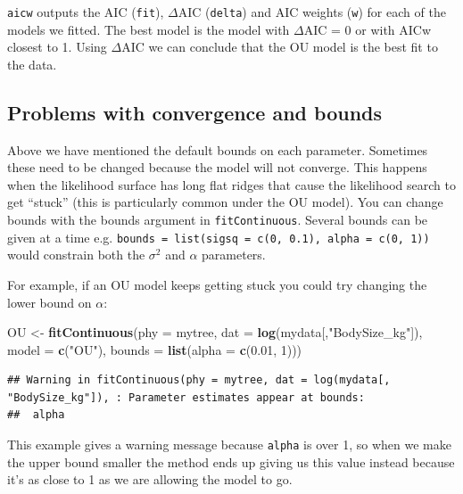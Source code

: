 \documentclass[]{book}
\newenvironment{Shaded}{\begin{snugshade}}{\end{snugshade}}
\newcommand{\KeywordTok}[1]{\textcolor[rgb]{0.13,0.29,0.53}{\textbf{{#1}}}}
\newcommand{\DataTypeTok}[1]{\textcolor[rgb]{0.13,0.29,0.53}{{#1}}}
\newcommand{\DecValTok}[1]{\textcolor[rgb]{0.00,0.00,0.81}{{#1}}}
\newcommand{\FloatTok}[1]{\textcolor[rgb]{0.00,0.00,0.81}{{#1}}}
\newcommand{\StringTok}[1]{\textcolor[rgb]{0.31,0.60,0.02}{{#1}}}
\newcommand{\NormalTok}[1]{{#1}}
\theoremstyle{definition}
\theoremstyle{definition}
\theoremstyle{definition}
\theoremstyle{remark}
\begin{document}
\texttt{aicw} outputs the AIC (\texttt{fit}), \(\Delta\)AIC
(\texttt{delta}) and AIC weights (\texttt{w}) for each of the models we
fitted. The best model is the model with \(\Delta\)AIC = 0 or with AICw
closest to 1. Using \(\Delta\)AIC we can conclude that the OU model is
the best fit to the data.

\subsection{Problems with convergence and
bounds}\label{problems-with-convergence-and-bounds}

Above we have mentioned the default bounds on each parameter. Sometimes
these need to be changed because the model will not converge. This
happens when the likelihood surface has long flat ridges that cause the
likelihood search to get ``stuck'' (this is particularly common under
the OU model). You can change bounds with the bounds argument in
\texttt{fitContinuous}. Several bounds can be given at a time e.g.
\texttt{bounds\ =\ list(sigsq\ =\ c(0,\ 0.1),\ alpha\ =\ c(0,\ 1))}
would constrain both the \(\sigma^2\) and \(\alpha\) parameters.

For example, if an OU model keeps getting stuck you could try changing
the lower bound on \(\alpha\):

\begin{Shaded}
\begin{Highlighting}[]
\NormalTok{OU <-}\StringTok{ }\KeywordTok{fitContinuous}\NormalTok{(}\DataTypeTok{phy =} \NormalTok{mytree, }\DataTypeTok{dat =} \KeywordTok{log}\NormalTok{(mydata[,}\StringTok{"BodySize_kg"}\NormalTok{]), }\DataTypeTok{model =} \KeywordTok{c}\NormalTok{(}\StringTok{"OU"}\NormalTok{), }
                    \DataTypeTok{bounds =} \KeywordTok{list}\NormalTok{(}\DataTypeTok{alpha =} \KeywordTok{c}\NormalTok{(}\FloatTok{0.01}\NormalTok{, }\DecValTok{1}\NormalTok{)))}
\end{Highlighting}
\end{Shaded}

\begin{verbatim}
## Warning in fitContinuous(phy = mytree, dat = log(mydata[, "BodySize_kg"]), : Parameter estimates appear at bounds:
##  alpha
\end{verbatim}

This example gives a warning message because \texttt{alpha} is over 1,
so when we make the upper bound smaller the method ends up giving us
this value instead because it's as close to 1 as we are allowing the
model to go.
\end{document}
